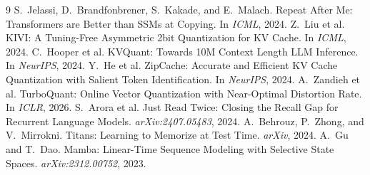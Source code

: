 \documentclass{article}
\begin{document}
\begin{thebibliography}{9}
\small
{} S.~Jelassi, D.~Brandfonbrener, S.~Kakade, and E.~Malach. Repeat After Me: Transformers are Better than SSMs at Copying. In \emph{ICML}, 2024.
 Z.~Liu et al. KIVI: A Tuning-Free Asymmetric 2bit Quantization for KV Cache. In \emph{ICML}, 2024.
 C.~Hooper et al. KVQuant: Towards 10M Context Length LLM Inference. In \emph{NeurIPS}, 2024.
 Y.~He et al. ZipCache: Accurate and Efficient KV Cache Quantization with Salient Token Identification. In \emph{NeurIPS}, 2024.
 A.~Zandieh et al. TurboQuant: Online Vector Quantization with Near-Optimal Distortion Rate. In \emph{ICLR}, 2026.
 S.~Arora et al. Just Read Twice: Closing the Recall Gap for Recurrent Language Models. \emph{arXiv:2407.05483}, 2024.
 A.~Behrouz, P.~Zhong, and V.~Mirrokni. Titans: Learning to Memorize at Test Time. \emph{arXiv}, 2024.
 A.~Gu and T.~Dao. Mamba: Linear-Time Sequence Modeling with Selective State Spaces. \emph{arXiv:2312.00752}, 2023.
\end{thebibliography}
\end{document}

